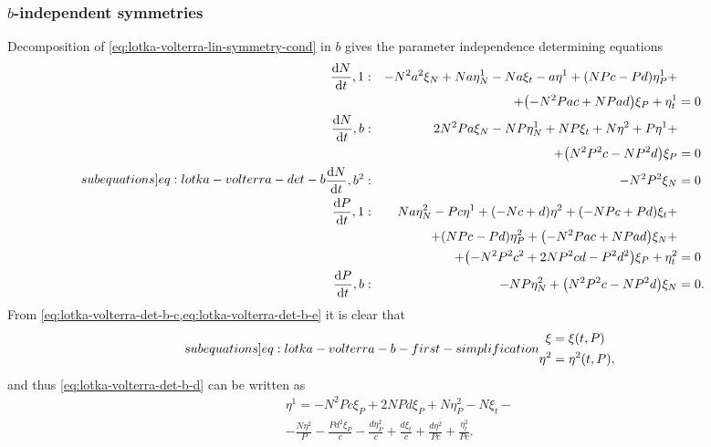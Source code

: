 \subsubsection{\texorpdfstring{\(b\)-independent symmetries}{b-independent symmetries}}

Decomposition of \cref{eq:lotka-volterra-lin-symmetry-cond} in \(b\) gives the parameter independence determining equations
\begin{subequations} \label[subequations]{eq:lotka-volterra-det-b}
  \begin{flalign}
    \diff{N}{t}, 1 & : & - N^{2} a^{2} \xi_{N} + N a \eta^1_{N} - N a \xi_{t} - a \eta^{1} + \left(N P c - P d\right) \eta^1_{P} +&&\\&&+ \left(- N^{2} P a c + N P a d\right) \xi_{P} + \eta^1_{t} &= 0 &\label{eq:lotka-volterra-det-b-a}\\
    \diff{N}{t}, b & : & 2 N^{2} P a \xi_{N} - N P \eta^1_{N} + N P \xi_{t} + N \eta^{2} + P \eta^{1} +&&\\&&+ \left(N^{2} P^{2} c - N P^{2} d\right) \xi_{P} &= 0 &\label{eq:lotka-volterra-det-b-b}\\
    \diff{N}{t}, b^2 & : & - N^{2} P^{2} \xi_{N} &= 0 &\label{eq:lotka-volterra-det-b-c}\\
    \diff{P}{t}, 1 & : & N a \eta^2_{N} - P c \eta^{1} + \left(- N c + d\right) \eta^{2} + \left(- N P c + P d\right) \xi_{t} +&&\\&&+ \left(N P c - P d\right) \eta^2_{P} + \left(- N^{2} P a c + N P a d\right) \xi_{N} +&&\\&&+ \left(- N^{2} P^{2} c^{2} + 2 N P^{2} c d - P^{2} d^{2}\right) \xi_{P} + \eta^2_{t} &= 0 &\label{eq:lotka-volterra-det-b-d}\\
    \diff{P}{t}, b & : & - N P \eta^2_{N} + \left(N^{2} P^{2} c - N P^{2} d\right) \xi_{N} &= 0. &\label{eq:lotka-volterra-det-b-e}
  \end{flalign}
\end{subequations}
From \cref{eq:lotka-volterra-det-b-c,eq:lotka-volterra-det-b-e} it is clear that
\begin{subequations} \label[subequations]{eq:lotka-volterra-b-first-simplification}
  \begin{align}
    \xi &= \xi(t, P) \\
    \eta^2 &= \eta^2(t, P),
  \end{align}
\end{subequations}
and thus \cref{eq:lotka-volterra-det-b-d} can be written as
\begin{multline*}
  \eta^{1} = - N^{2} P c \xi_{P} + 2 N P d \xi_{P} + N \eta^2_{P} - N \xi_{t} -\\- \frac{N \eta^{2}}{P} - \frac{P d^{2} \xi_{P}}{c} - \frac{d \eta^2_{P}}{c} + \frac{d \xi_{t}}{c} + \frac{d \eta^{2}}{P c} + \frac{\eta^2_{t}}{P c}.
\end{multline*}
